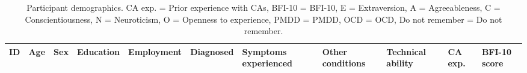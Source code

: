 
\begin{landscape}  
 
\begin{table}[t]

\setlength{\tabcolsep}{0em}

\caption{\footnotesize{Participant demographics. \ac{CA} exp. = Prior experience with \acp{CA}, 
BFI-10 = \ac{BFI-10}, E = Extraversion, A = Agreeableness, C = Conscientiousness, N = Neuroticism, O = Openness to experience, PMDD = \acl{PMDD}, OCD = \acl{OCD}, Do not remember = Do not remember.} }
\scriptsize
\renewcommand{\arraystretch}{2.15}    
    \begin{tabular}{p{0.75cm} p{1.25cm} p{1cm} p{2cm} p{2cm} p{2cm} p{3cm} p{2.5cm} p{2.5cm} p{1.5cm} p{1.5cm}}
    \hline
         \textbf{ID} & \textbf{Age} & \textbf{Sex} & \textbf{Education} & \textbf{Employment} & \textbf{Diagnosed} & \textbf{Symptoms experienced} &  \textbf{Other conditions} & \textbf{Technical ability} & \textbf{\ac{CA} exp.} & \textbf{\ac{BFI-10} score} \\
    \midrule 


\end{tabular}
\end{table}
\end{landscape}
